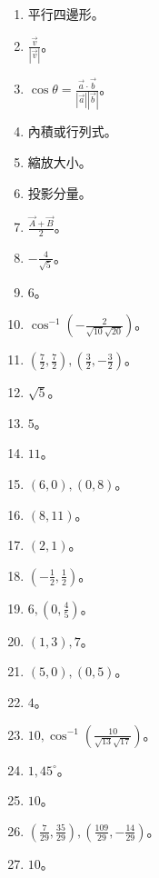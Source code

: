 \begin{enumerate}[label=\arabic*.]
    \item 平行四邊形。
    \item $\frac{\vec{v}}{|\vec{v}|}$。
    \item $\cos \theta = \frac{\vec{a} \cdot \vec{b}}{|\vec{a}| |\vec{b}|}$。
    \item 內積或行列式。
    \item 縮放大小。
    \item 投影分量。
    \item $\frac{\vec{A} + \vec{B}}{2}$。
    \item $-\frac{4}{\sqrt{5}}$。
    \item $6$。
    \item $\cos^{-1}\left(-\frac{2}{\sqrt{10} \sqrt{20}}\right)$。
    \item $\left(\frac{7}{2}, \frac{7}{2}\right), \left(\frac{3}{2}, -\frac{3}{2}\right)$。
    \item $\sqrt{5}$。
    \item $5$。
    \item $11$。
    \item $(6, 0), (0, 8)$。
    \item $(8, 11)$。
    \item $(2, 1)$。
    \item $\left(-\frac{1}{2}, \frac{1}{2}\right)$。
    \item $6, \left(0, \frac{4}{5}\right)$。
    \item $(1, 3), 7$。
    \item $(5, 0), (0, 5)$。
    \item $4$。
    \item $10, \cos^{-1}\left(\frac{10}{\sqrt{13} \sqrt{17}}\right)$。
    \item $1, 45^\circ$。
    \item $10$。
    \item $\left(\frac{7}{29}, \frac{35}{29}\right), \left(\frac{109}{29}, -\frac{14}{29}\right)$。
    \item $10$。
\end{enumerate}